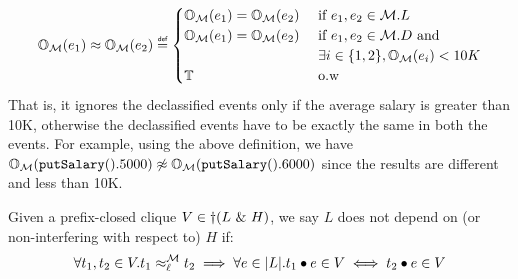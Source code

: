 \documentclass[acmsmall,screen,review, nonacm]{acmart}
\begin{document}
\begin{example}
  \[
  \ob{e_1}{\classpart}{L} \obsim \ob{e_2}{\classpart}{L} \isdef \begin{cases}
    \ob{e_1}{\classpart}{L} = \ob{e_2}{\classpart}{L} &\mbox{ if } e_1, e_2 \in \classpart.L \\
    \ob{e_1}{\classpart}{L} = \ob{e_2}{\classpart}{L} &\mbox{ if } e_1, e_2 \in \classpart.D \text{ and} \\
     &\mbox{ } \exists i \in \{1, 2\}, \ob{e_i}{\classpart}{L} < 10K \\
    \true &\mbox{ o.w }
  \end{cases}
  \]
  That is, it ignores the declassified events only if the average salary is greater than 10K, otherwise the declassified events have to be exactly the same in both the events.
  For example, using the above definition, we have $\ob{\mycode{putSalary}().5000}{\classpart}{L} \not \obsim \ob{\mycode{putSalary}().6000}{\classpart}{L}$ since the results are different and less than 10K.
\end{example}


\begin{definition}\label{def:relaxni}
  Given a prefix-closed clique $V \in \dagger(L \directprod H)$, we say $L$ does not depend on (or non-interfering with respect to) $H$ if:
  \[
  \forall t_1, t_2 \in V. \treq{t_1}{t_2}{\ell}{\classpart}  \implies \forall e \in \abs{L}. t_1  \tracecat e \in V \iff t_2 \tracecat e \in V
  \]
\end{definition}



\begin{definition}\label{def:ni2}

  \mytodo{\dots}
  
\end{definition}





\end{document}
